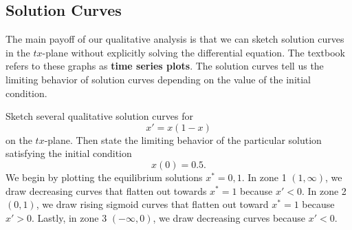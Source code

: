 \documentclass[10pt,letterpaper]{article}
\begin{document}
\subsection{Solution Curves}
The main payoff of our qualitative analysis is that we can sketch solution
curves in the $tx$-plane without explicitly solving the differential
equation. The textbook refers to these graphs as \textbf{time series plots}. The solution curves tell us the limiting behavior of solution curves depending on the value of the initial condition. 

\begin{example}[5]{
Sketch several qualitative solution curves for
$$
x' = x(1-x)
$$
on the $tx$-plane. Then state the limiting behavior of the particular solution satisfying the initial condition
$$
x(0)=0.5.
$$
}
We begin by plotting the equilibrium solutions $x^*= 0,1$. In zone 1 $(1,\infty)$, we draw decreasing curves that flatten out towards $x^*=1$ because $x'<0$. In zone 2 $(0,1)$, we draw rising sigmoid curves that flatten out toward $x^*=1$ because $x'>0$. Lastly, in zone 3 $(-\infty,0)$, we draw decreasing curves because $x'<0$.  

\begin{figure}[H]
\centering
{}
\end{figure}
\end{example}
\end{document}
